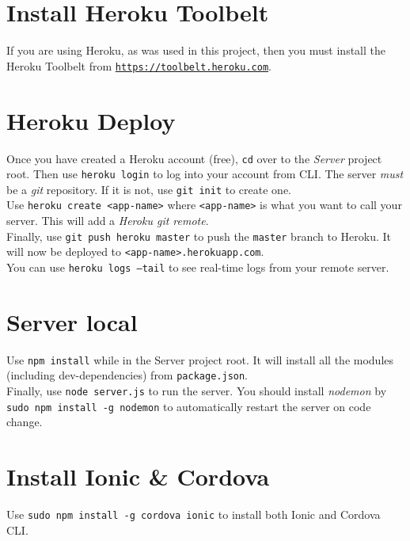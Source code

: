 \section{Install Heroku Toolbelt}

If you are using Heroku, as was used in this project, then you must install the Heroku Toolbelt from \texttt{\hyperref[https://toolbelt.heroku.com]{https://toolbelt.heroku.com}}.

\section{Heroku Deploy}

Once you have created a Heroku account (free), \texttt{cd} over to the \textit{Server} project root. Then use \texttt{heroku login} to log into your account from CLI. The server \textit{must} be a \textit{git} repository. If it is not, use \texttt{git init} to create one.\\

Use \texttt{heroku create <app-name>} where \texttt{<app-name>} is what you want to call your server. This will add a \textit{Heroku git remote}.\\

Finally, use \texttt{git push heroku master} to push the \texttt{master} branch to Heroku. It will now be deployed to \texttt{<app-name>.herokuapp.com}.\\

You can use \texttt{heroku logs --tail} to see real-time logs from your remote server.

\section{Server local}

Use \texttt{npm install} while in the Server project root. It will install all the modules (including dev-dependencies) from \texttt{package.json}.\\

Finally, use \texttt{node server.js} to run the server. You should install \textit{nodemon} by \texttt{sudo npm install -g nodemon} to automatically restart the server on code change.

\section{Install Ionic \& Cordova}

Use \texttt{sudo npm install -g cordova ionic} to install both Ionic and Cordova CLI.\\

